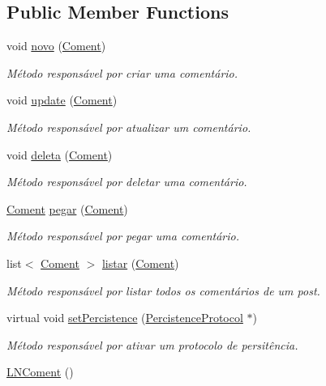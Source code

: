 \subsection*{Public Member Functions}
\begin{DoxyCompactItemize}
\item 
void \hyperlink{class_l_n_coment_a0c4839930f9a6d65f6200845fdab9750}{novo} (\hyperlink{class_coment}{Coment})
\begin{DoxyCompactList}\small\item\em Método responsável por criar uma comentário. \end{DoxyCompactList}\item 
void \hyperlink{class_l_n_coment_acefe80ac606f9258093f22eca0759cb0}{update} (\hyperlink{class_coment}{Coment})
\begin{DoxyCompactList}\small\item\em Método responsável por atualizar um comentário. \end{DoxyCompactList}\item 
void \hyperlink{class_l_n_coment_abf2ff1565521a03e001ff907eeec7fe9}{deleta} (\hyperlink{class_coment}{Coment})
\begin{DoxyCompactList}\small\item\em Método responsável por deletar uma comentário. \end{DoxyCompactList}\item 
\hyperlink{class_coment}{Coment} \hyperlink{class_l_n_coment_a321fb89a92d2af289267c0ccac1c090f}{pegar} (\hyperlink{class_coment}{Coment})
\begin{DoxyCompactList}\small\item\em Método responsável por pegar uma comentário. \end{DoxyCompactList}\item 
list$<$ \hyperlink{class_coment}{Coment} $>$ \hyperlink{class_l_n_coment_a277bc9cf3aea9deedda7272e7ca737a6}{listar} (\hyperlink{class_coment}{Coment})
\begin{DoxyCompactList}\small\item\em Método responsável por listar todos os comentários de um post. \end{DoxyCompactList}\item 
virtual void \hyperlink{class_l_n_coment_abdf75faf2dc51482a09958f78095b008}{set\-Percistence} (\hyperlink{class_percistence_protocol}{Percistence\-Protocol} $\ast$)
\begin{DoxyCompactList}\small\item\em Método responsável por ativar um protocolo de persitência. \end{DoxyCompactList}\item 
\hypertarget{class_l_n_coment_a19bb165b5bd6a9479756cb4057238252}{\hyperlink{class_l_n_coment_a19bb165b5bd6a9479756cb4057238252}{L\-N\-Coment} ()}\label{class_l_n_coment_a19bb165b5bd6a9479756cb4057238252}


\end{DoxyCompactItemize}
